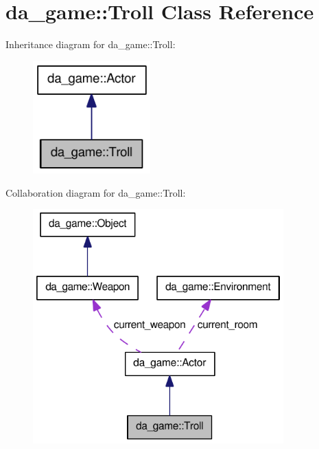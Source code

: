 \hypertarget{classda__game_1_1Troll}{
\section{da\_\-game::Troll Class Reference}
\label{classda__game_1_1Troll}
}
Inheritance diagram for da\_\-game::Troll:\nopagebreak
\begin{figure}[H]
\begin{center}
\leavevmode
\includegraphics[width=128pt]{classda__game_1_1Troll__inherit__graph}
\end{center}
\end{figure}
Collaboration diagram for da\_\-game::Troll:\nopagebreak
\begin{figure}[H]
\begin{center}
\leavevmode
\includegraphics[width=274pt]{classda__game_1_1Troll__coll__graph}
\end{center}
\end{figure}
